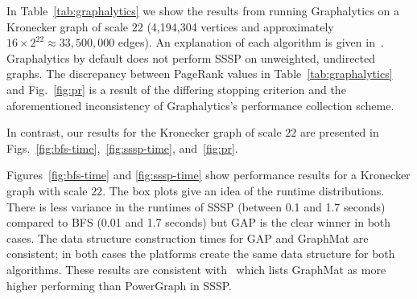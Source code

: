 \documentclass[conference]{IEEEtran}
\begin{document}
In Table~\ref{tab:graphalytics} we show the results from running Graphalytics on a Kronecker graph of scale $22$ (4,194,304 vertices and approximately $16 \times 2^{22} \approx 33,500,000$ edges). An explanation of each algorithm is given in~\cite{Iosup:2016:Graphalyticstech}. Graphalytics by default does not perform SSSP on unweighted, undirected graphs. The discrepancy between PageRank values in Table~\ref{tab:graphalytics} and Fig.~\ref{fig:pr} is a result of the differing stopping criterion and the aforementioned inconsistency of Graphalytics's performance collection scheme.

In contrast, our results for the Kronecker graph of scale $22$ are presented in Figs.~\ref{fig:bfs-time},~\ref{fig:sssp-time}, and~\ref{fig:pr}.


Figures~\ref{fig:bfs-time} and \ref{fig:sssp-time} show performance results for a Kronecker graph with scale $22$. The box plots give an idea of the runtime distributions. There is less variance in the runtimes of SSSP (between 0.1 and 1.7 seconds) compared to BFS (0.01 and 1.7 seconds) but GAP is the clear winner in both cases. The data structure construction times for GAP and GraphMat are consistent; in both cases the platforms create the same data structure for both algorithms. These results are consistent with~\cite{Sundaram:2015:GraphMat} which lists GraphMat as more higher performing than PowerGraph in SSSP.
\end{document}
